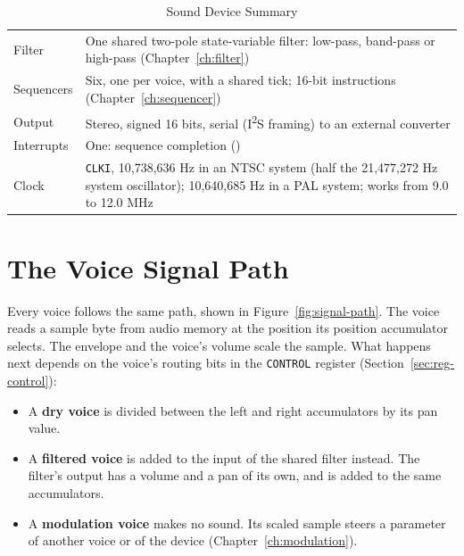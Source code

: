\begin{table}[H]
\begin{tabular}{lp{9cm}}
		Filter            & One shared two-pole state-variable filter: low-pass, band-pass or high-pass (Chapter~\ref{ch:filter})                                                \\
		Sequencers        & Six, one per voice, with a shared tick; 16-bit instructions (Chapter~\ref{ch:sequencer})                                                             \\
		Output            & Stereo, signed 16 bits, serial (I\textsuperscript{2}S framing) to an external converter                                                              \\
		Interrupts        & One: sequence completion (\activelow{IRQ3})                                                                                                          \\
		Clock             & \texttt{CLKI}, 10,738,636 Hz in an NTSC system (half the 21,477,272 Hz system oscillator); 10,640,685 Hz in a PAL system; works from 9.0 to 12.0 MHz \\
		\bottomrule
	\end{tabular}
	\caption{Sound Device Summary}
	\label{tab:device-summary}
\end{table}

\section{The Voice Signal Path}
\label{sec:signal-path}

Every voice follows the same path, shown in Figure~\ref{fig:signal-path}. The voice reads a sample byte from audio
memory at the position its position accumulator selects. The envelope and the voice's volume scale the sample. What
happens next depends on the voice's routing bits in the \texttt{CONTROL} register (Section~\ref{sec:reg-control}):

\begin{itemize}
	\item A \textbf{dry voice} is divided between the left and right accumulators by its pan value.
	\item A \textbf{filtered voice} is added to the input of the shared filter instead. The filter's output has a volume and a
	      pan of its own, and is added to the same accumulators.
	\item A \textbf{modulation voice} makes no sound. Its scaled sample steers a parameter of another voice or of the device
	      (Chapter~\ref{ch:modulation}).
\end{itemize}

